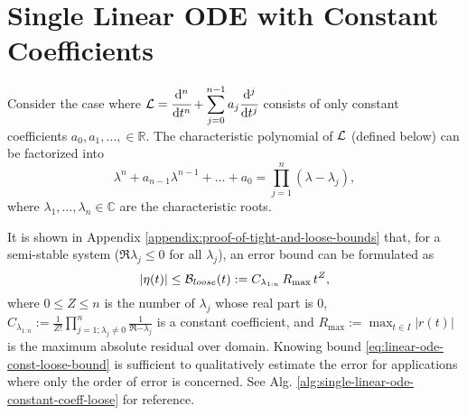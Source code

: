 \section{Single Linear ODE with Constant Coefficients}\label{section:single-linear-ode-with-constant-coefficients}
    Consider the case where $\displaystyle \mathcal{L} = \cfrac{\mathrm{d}^{n} }{\mathrm{d} t^{n}} + \sum_{j=0}^{n - 1} a_j \cfrac{\mathrm{d}^{j} }{\mathrm{d} t^{j}}$ consists of only constant coefficients $a_0, a_1, \dots, \in \mathbb{R}$.
    The characteristic polynomial of $\mathcal{L}$ (defined below) can be factorized into
    {
        \begin{equation} \label{eq:single-linear-ode-characteristic-polynomial-factorization}
            \lambda^n + a_{n-1}\lambda^{n-1} + \dots + a_0 = \prod_{j=1}^{n}(\lambda - \lambda_j),
        \end{equation}
    }
    where $\lambda_1, \dots, \lambda_n \in \mathbb{C}$ are the characteristic roots. 

    It is shown in Appendix \ref{appendix:proof-of-tight-and-loose-bounds} that, for a semi-stable system ($\Re{\lambda_j} \leq 0$ for all $\lambda_j$), an error bound can be formulated as
    \begin{equation} \label{eq:linear-ode-const-loose-bound}
        \left|\eta(t)\right| \leq \mathcal{B}_{loose}(t) := C_{\lambda_{1:n}}\, R_{\max}\, t^{Z},
    \end{equation}
    where $0\leq Z \leq n$ is the number of $\lambda_j$ whose real part is $0$, $\displaystyle C_{\lambda_{1:n}} := \frac{1}{Z!}\prod_{j=1; \lambda_j\neq 0}^{n} \frac{1}{\Re{-\lambda_j}}$ is a constant coefficient, and $\displaystyle R_{\max}:=\max_{t\in I} |r(t)|$ is the maximum absolute residual over domain. 
    Knowing bound \eqref{eq:linear-ode-const-loose-bound} is sufficient to qualitatively estimate the error for applications where only the order of error is concerned. See Alg. \ref{alg:single-linear-ode-constant-coeff-loose} for reference.

